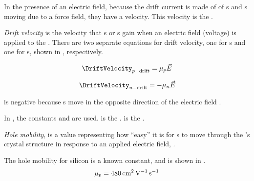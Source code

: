 In the presence of an electric field, because the drift current is made of of s and s moving due to a force field, they have a velocity.
This velocity is the .

\begin{definition}\label{def:Drift_Velocity}
  \emph{Drift velocity} is the velocity that s or s gain when an electric field (voltage) is applied to the .
  There are two separate equations for drift velocity, one for s and one for s, shown in , respectively.
\end{definition}

\begin{equation}\label{eq:Drift_Velocity-Hole}
  \DriftVelocity_{\HoleConcentration-\text{drift}} = \HoleMobility \EField
\end{equation}

\begin{equation}\label{eq:Drift_Velocity-Electron}
  \DriftVelocity_{\ElectronConcentration-\text{drift}} = -\ElectronMobility \EField
\end{equation}

 is negative because s move in the opposite direction of the electric field \EField{}.

In , the constants \HoleMobility{} and \ElectronMobility{} are used.
\HoleMobility{} is the .
\ElectronMobility{} is the .

\begin{definition}\label{def:Hole_Mobility}
  \emph{Hole mobility}, \HoleMobility{} is a value representing how ``easy'' it is for s to move through the 's crystal structure in response to an applied electric field, \EField{}.

  The hole mobility for  silicon is a known constant, and is shown in .
  \begin{equation}\label{eq:Hole_Mobility-Intrinsic_Silicon}
    \mu_{p} = \SI{480}{\centi\meter\squared\per\volt\per\second}
  \end{equation}
\end{definition}

